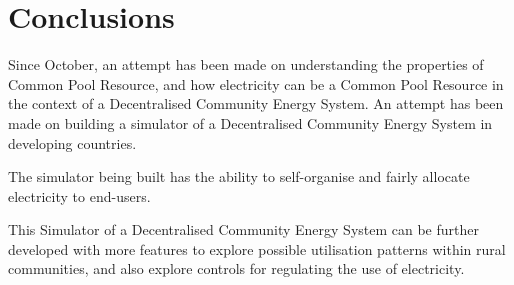 \chapter{Conclusions}
\label{Conclusions}

Since October, an attempt has been made on understanding the properties of Common Pool Resource, and how electricity can be a Common Pool Resource in the context of a Decentralised Community Energy System. An attempt has been made on building a simulator of a Decentralised Community Energy System in developing countries. 

The simulator being built has the ability to self-organise and fairly allocate electricity to end-users.

This Simulator of a Decentralised Community Energy System can be further developed with more features to explore possible utilisation patterns within rural communities, and also explore controls for regulating the use of electricity. 